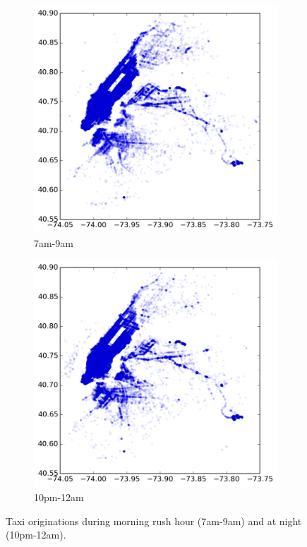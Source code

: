 \documentclass[12pt]{article}
\theoremstyle{definition}
\theoremstyle{algodesc}
\begin{document}
\begin{figure}[htbp] \centering
  \begin{subfigure}[t]{.49\linewidth}
    \includegraphics[width=\linewidth]{./include/diff_morningrush.png}
    \caption{7am-9am} \label{fig:diff:morning}
  \end{subfigure}
  \begin{subfigure}[t]{.49\linewidth}
    \includegraphics[width=\linewidth]{./include/diff_night.png}
    \caption{10pm-12am} \label{fig:diff:night}
  \end{subfigure}
  \caption{Taxi originations during morning rush hour (7am-9am) and at night (10pm-12am).}
  \label{fig:diff}
\end{figure}
\end{document}
